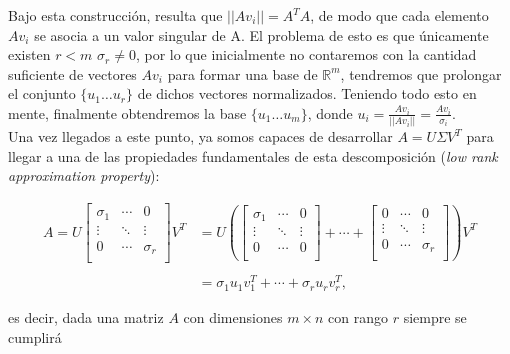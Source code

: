 Bajo esta construcción, resulta que $||A v_i|| = A^T A$, de modo que cada elemento $A v_i$ se asocia a un valor singular de A. El problema de esto es que únicamente existen $r < m$ $\sigma_r \neq 0$, por lo que inicialmente no contaremos con la cantidad suficiente de vectores $A v_i$ para formar una base de $\mathds{R}^m$, tendremos que prolongar el conjunto $\{u_1 \dots u_r\}$ de dichos vectores normalizados. Teniendo todo esto en mente, finalmente obtendremos la base $\{u_1 \dots u_m\}$, donde $u_i = \frac{A v_i}{||A v_i||} = \frac{A v_i}{\sigma_i}$. \\



Una vez llegados a este punto, ya somos capaces de
desarrollar $A = U \Sigma V^T$ para llegar a una de las propiedades fundamentales de esta descomposición (\textit{low rank approximation property}): 

\begin{equation*}
    \begin{array}{ll}
        A = U 
        \begin{bmatrix}
        \sigma_1 & \cdots & 0        \\
        \vdots   & \ddots & \vdots   \\
        0        & \cdots & \sigma_r \\
        \end{bmatrix}
        V^T & = U
        \left(
        \begin{bmatrix}
        \sigma_1 & \cdots & 0        \\
        \vdots   & \ddots & \vdots   \\
        0        & \cdots & 0        \\
        \end{bmatrix} + \cdots +
        \begin{bmatrix}
        0        & \cdots & 0        \\
        \vdots   & \ddots & \vdots   \\
        0        & \cdots & \sigma_r \\
        \end{bmatrix}
        \right) V^T\\
        \\
         & = \sigma_1 u_1 v_1^T + \cdots + \sigma_r u_r  v_r^T,
    \end{array}
\end{equation*}

es decir, dada una matriz $A$ con dimensiones $m \times n$ con rango $r$ siempre se cumplirá

